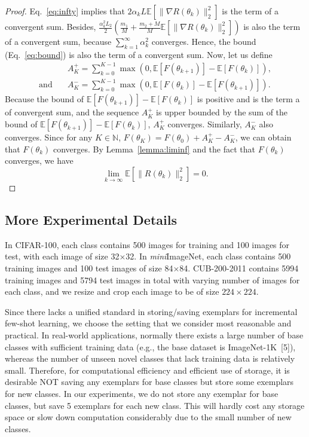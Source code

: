 \documentclass{article}
\begin{document}
\begin{proof}
Eq.~\ref{eq:infty} implies that $2\alpha_k L\mathbb{E}[\|\nabla R(\theta_k)\|_2^2]$ is the term of a convergent sum. Besides, $\frac{\alpha_k^2 L_2}{2}(\frac{m_1}{M} + \frac{m_2+M}{M}\mathbb{E}[\|\nabla R(\theta_k)\|_2^2] )$ is also the term of a convergent sum, because $\sum_{k=1}^{\infty}\alpha_k^2$ converges. Hence, the bound (Eq.~\ref{eq:bound}) is also the term of a convergent sum.
Now, let us define
\begin{align}
    & A_{K}^{+} = \sum_{k=0}^{K-1}\max(0, \mathbb{E}[F(\theta_{k+1})] -  \mathbb{E}[F(\theta_k)]), \\
    \mathrm{and}\quad & A_{K}^{-} = \sum_{k=0}^{K-1}\max(0, \mathbb{E}[F(\theta_k)]-\mathbb{E}[F(\theta_{k+1})]).
\end{align}
Because the bound of $\mathbb{E}[F(\theta_{k+1})] -  \mathbb{E}[F(\theta_k)]$ is positive and is the term a of convergent sum, and the sequence $A_{K}^{+}$ is upper bounded by the sum of the bound of $\mathbb{E}[F(\theta_{k+1})] -  \mathbb{E}[F(\theta_k)]$, $A_{K}^{+}$ converges. Similarly, $A_{K}^{-}$ also converges. Since for any $K\in\mathbb{N}$, $F(\theta_K) = F(\theta_0) + A_{K}^{+} - A_{K}^{-}$, we can obtain that $F(\theta_k)$ converges. By Lemma~\ref{lemma:liminf} and the fact that $F(\theta_k)$ converges, we have
\begin{equation}
    \lim_{k\to\infty}\mathbb{E}[\|R(\theta_k)\|_2^2] = 0.
\end{equation}
\end{proof}

\subsection{More Experimental Details} \label{appendix:setup}
In CIFAR-100, each class contains 500 images for training and 100 images for test, with each image of size 32×32. In \emph{mini}ImageNet, each class contains 500 training images and 100 test images of size 84×84. CUB-200-2011 contains 5994 training images and 5794 test images in total with varying number of images for each class, and we resize and crop each image to be of size $224\times224$.

Since there lacks a unified standard in storing/saving exemplars for incremental few-shot learning, we choose the setting that we consider most reasonable and practical. In real-world applications, normally there exists a large number of base classes with sufficient training data (e.g., the base dataset is ImageNet-1K~[5]), whereas the number of unseen novel classes that lack training data is relatively small. Therefore, for computational efficiency and efficient use of storage, it is desirable NOT saving any exemplars for base classes but store some exemplars for new classes. In our experiments, we do not store any exemplar for base classes, but save 5 exemplars for each new class. This will hardly cost any storage space or slow down computation considerably due to the small number of new classes.
\end{document}
